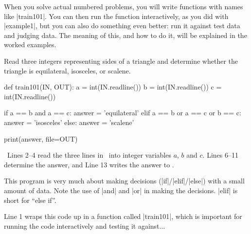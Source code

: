 When you solve actual numbered problems, you will write functions with names like
\pycode|train101|. You can then run the function interactively, as you did with
\pycode|example1|, but you can also do something even better: run it against test data and
judging data. The meaning of this, and how to do it, will be explained in the worked
examples.


\clearpage


\Question Read three integers representing sides of a triangle and
determine whether the triangle is equilateral, isosceles, or scalene.

\Sample

               {}
               {}

\Solution

\begin{pythoncode} 
  def train101(IN, OUT):
    a = int(IN.readline())
    b = int(IN.readline())
    c = int(IN.readline())

    if a == b and a == c:
      answer = 'equilateral'
    elif a == b or a == c or b == c:
      answer = 'isosceles'
    else:
      answer = 'scalene'

    print(answer, file=OUT)
\end{pythoncode}

\Explanation\ Lines 2--4 read the three lines in \IN\ into integer variables $a$, $b$ and
$c$. Lines 6--11 determine the answer, and Line 13 writes the answer to \OUT.

This program is very much about making decisions (\pycode|if|/\pycode|elif|/\pycode|else|)
with a small amount of data. Note the use of \pycode|and| and \pycode|or| in making the
decisions. \pycode|elif| is short for ``else if''.

Line 1 wraps this code up in a function called \pycode|train101|, which is important for
running the code interactively and testing it against...


